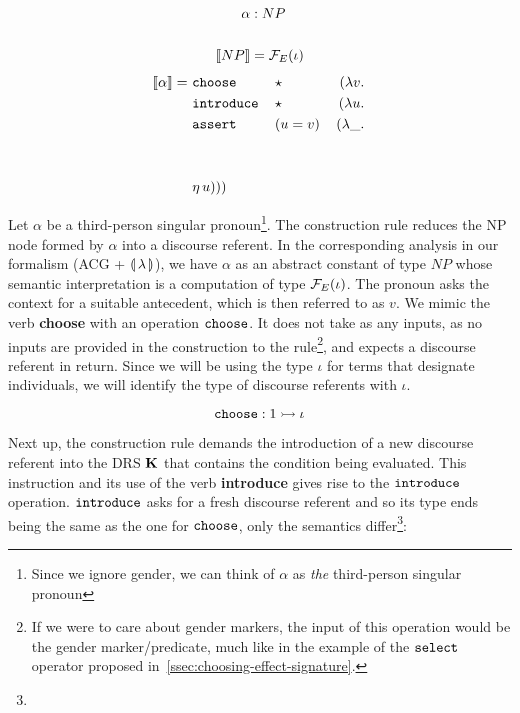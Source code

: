 \begin{minipage}{0.63\textwidth}
\crprobox
\end{minipage}
\begin{minipage}{0.36\textwidth}
\vspace{0.4cm}
\begin{align*}
\alpha &: NP \\ \\
\llbracket NP \rrbracket &= \mathcal{F}_E(\iota)
\end{align*}
\vspace{0.1cm}
\begin{align*}
\llbracket \alpha \rrbracket =\ & \mathtt{choose}\,&&\star\, &(\lambda v.\,  \\
                & \mathtt{introduce}\,&&\star\, &(\lambda u.\,  \\
                & \mathtt{assert}\,&&(u = v)\, &(\lambda \_.\,  \\
                \\ \\
                & \eta\,u)))
\end{align*}
\end{minipage}

\vspace{3mm}

Let $\alpha$ be a third-person singular pronoun\footnote{Since we ignore
  gender, we can think of $\alpha$ as \emph{the} third-person singular
  pronoun}. The construction rule reduces the NP node formed by $\alpha$
into a discourse referent. In the corresponding analysis in our formalism
(ACG + $\llparenthesis \, \lambda \, \rrparenthesis$), we have $\alpha$ as an abstract constant of
type $NP$ whose semantic interpretation is a computation of type
$\mathcal{F}_E(\iota)$. The pronoun asks the context for a suitable antecedent,
which is then referred to as $v$. We mimic the verb \textbf{choose} with an
operation $\mathtt{choose}$. It does not take as any inputs, as no inputs are
provided in the construction to the rule\footnote{If we were to care about
  gender markers, the input of this operation would be the gender
  marker/predicate, much like in the example of the $\mathtt{select}$ operator
  proposed in~\ref{ssec:choosing-effect-signature}.}, and expects a
discourse referent in return. Since we will be using the type $\iota$ for
terms that designate individuals, we will identify the type of discourse
referents with $\iota$.

$$
\mathtt{choose} : 1 \rightarrowtail \iota
$$

Next up, the construction rule demands the introduction of a new discourse
referent into the DRS $\mathbf{K}$ that contains the condition being
evaluated. This instruction and its use of the verb \textbf{introduce}
gives rise to the $\mathtt{introduce}$ operation. $\mathtt{introduce}$ asks for a
fresh discourse referent and so its type ends being the same as the one for
$\mathtt{choose}$, only the semantics differ\footnote{}:

